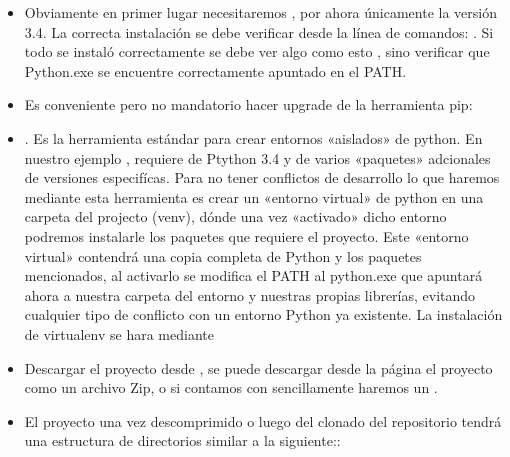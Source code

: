 \documentclass[a4paper,12pt,spanish]{sphinxmanual}
\begin{document}
\begin{itemize}
\item {} 
Obviamente en primer lugar necesitaremos ,
por ahora únicamente la versión 3.4. La correcta instalación se debe verificar desde la línea de comandos:
. Si todo se instaló correctamente se debe ver algo como esto , sino verificar
que Python.exe se encuentre correctamente apuntado en el PATH.

\item {} 
Es conveniente pero no mandatorio hacer upgrade de la herramienta pip: 

\item {} 
. Es la herramienta estándar para crear entornos «aislados»
de python. En nuestro ejemplo , requiere de Ptython 3.4 y de varios «paquetes» adcionales de
versiones especifícas. Para no tener conflictos de desarrollo lo que haremos mediante esta herramienta es
crear un «entorno virtual» de python en una carpeta del projecto (venv), dónde una vez «activado» dicho
entorno podremos instalarle los paquetes que requiere el proyecto. Este «entorno virtual» contendrá una
copia completa de Python y los paquetes mencionados, al activarlo se modifica el PATH al python.exe que
apuntará ahora a nuestra carpeta del entorno y nuestras propias librerías, evitando cualquier tipo de
conflicto con un entorno Python ya existente. La instalación de virtualenv se hara mediante 

\item {} 
Descargar el proyecto desde , se puede descargar
desde la página el proyecto como un archivo Zip, o si contamos con 
sencillamente haremos un .

\item {} 
El proyecto una vez descomprimido o luego del clonado del repositorio tendrá una estructura de directorios
similar a la siguiente::

\begin{sphinxVerbatim}[commandchars=\\\{\}]
\end{sphinxVerbatim}

\end{itemize}
\end{document}
